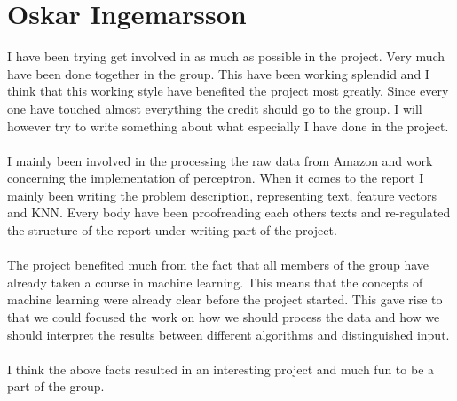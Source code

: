 \section*{Oskar Ingemarsson}
I have been trying get involved in as much as possible in the project.
Very much have been done together in the group. This have been working
splendid and I think that this working style have benefited the project most
greatly. Since every one have touched almost everything the credit should go to
the group. I will however try to write something about what especially I have
done in the project.
\\\\
I mainly been involved in the processing the raw data from Amazon and work
concerning the implementation of perceptron. When it comes to the report I
mainly been writing the problem description, representing text, feature vectors
and KNN. Every body have been proofreading each others texts and re-regulated the
structure of the report under writing part of the project.
\\\\
The project benefited much from the fact that all members of the group have
already taken a course in machine learning. This means that the concepts of
machine learning were already clear before the project started. This
gave rise to that we could focused the work on how we should process the data
and how we should interpret the results between different algorithms and
distinguished input.
\\\\
I think the above facts resulted in an interesting project and much fun to be a
part of the group.


